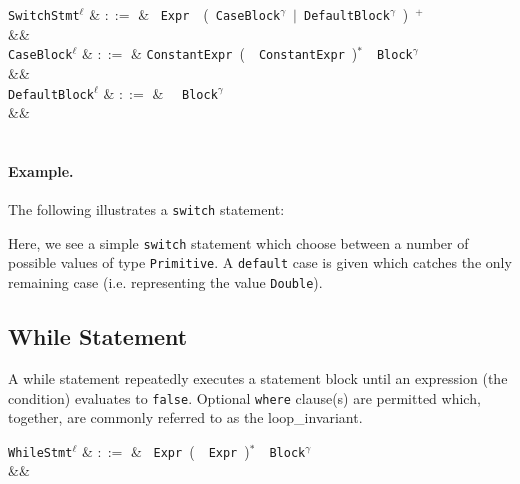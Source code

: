 \begin{syntax}
  \verb+SwitchStmt+$^\ell$ & $::=$ & \ \verb+Expr+\ \token{:}\ \big(\ \verb+CaseBlock+$^\gamma$\ $|$\ \verb+DefaultBlock+$^\gamma$\ \big)\ $^+$\\
  &&\\
  \verb+CaseBlock+$^\ell$ & $::=$ &  \verb+ConstantExpr+\ \big(\ \token{,}\ \verb+ConstantExpr+\ \big)$^*$\ \token{:}\ \verb+Block+$^\gamma$\\
  &&\\
  \verb+DefaultBlock+$^\ell$ & $::=$ & \ \token{:}\ \verb+Block+$^\gamma$\\
&&\\
\\
\end{syntax}

\paragraph{Example.} The following illustrates a \lstinline{switch} statement:



Here, we see a simple \lstinline{switch} statement which choose between a number of possible values of type \lstinline{Primitive}.  A \lstinline{default} case is given which catches the only remaining case (i.e. representing the value \lstinline{Double}).


\subsection{While Statement}
\label{c_stmts_while}
A while statement repeatedly executes a statement block until an expression (the condition) evaluates to \lstinline{false}.  Optional \lstinline{where} clause(s) are permitted which, together, are commonly referred to as the \gls{loop_invariant}.  

\begin{syntax}
  \verb+WhileStmt+$^\ell$ & $::=$ & \ \verb+Expr+\ \big(\
  \ \verb+Expr+\ \big)$^*$\ \token{:}\ \verb+Block+$^\gamma$\ \\
&&\\
\\
\end{syntax}

